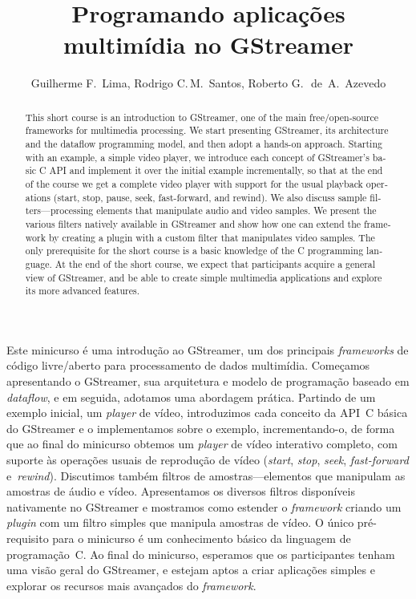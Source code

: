 \documentclass{SBCbookchapter}
\title{Programando aplicações multimídia no GStreamer}
\author{%
  Guilherme F.~Lima,
  Rodrigo C.\,M.~Santos,
  Roberto G.\,~de~A.~Azevedo
}
\begin{document}
\maketitle
{}\baselineskip\strut
\begin{abstract}
  \begin{otherlanguage}{english}
    This short course is an introduction to GStreamer, one of the main
    free/open-source frameworks for multimedia processing.  We start
    presenting GStreamer, its architecture and the dataflow programming
    model, and then adopt a hands-on approach.  Starting with an example, a
    simple video player, we introduce each concept of GStreamer’s basic C
    API and implement it over the initial example incrementally, so that at
    the end of the course we get a complete video player with support for
    the usual playback operations (start, stop, pause, seek, fast-forward,
    and rewind).  We also discuss sample filters---processing elements that
    manipulate audio and video samples.  We present the various filters
    natively available in GStreamer and show how one can extend the
    framework by creating a plugin with a custom filter that manipulates
    video samples.  The only prerequisite for the short course is a basic
    knowledge of the C programming language.  At the end of the short
    course, we expect that participants acquire a general view of GStreamer,
    and be able to create simple multimedia applications and explore its
    more advanced features.
  \end{otherlanguage}
\end{abstract}
\begin{resumo}
  Este minicurso é uma introdução ao GStreamer, um dos principais
  \emph{frameworks} de código livre/aberto para processamento de dados
  multimídia.  Começamos apresentando o GStreamer, sua arquitetura e modelo
  de programação baseado em \emph{dataflow}, e em seguida, adotamos uma
  abordagem prática.  Partindo de um exemplo inicial, um \emph{player} de
  vídeo, introduzimos cada conceito da API~C básica do GStreamer e o
  implementamos sobre o exemplo, incrementando-o, de forma que ao final do
  minicurso obtemos um \emph{player} de vídeo interativo completo, com
  suporte às operações usuais de reprodução de vídeo (\emph{start},
  \emph{stop}, \emph{seek}, \emph{fast-forward} e~\emph{rewind}).
  Discutimos também filtros de amostras---elementos que manipulam as
  amostras de áudio e vídeo.  Apresentamos os diversos filtros disponíveis
  nativamente no GStreamer e mostramos como estender o \emph{framework}
  criando um \emph{plugin} com um filtro simples que manipula amostras de
  vídeo.  O único pré-requisito para o minicurso é um conhecimento básico da
  linguagem de programação~C.  Ao final do minicurso, esperamos que os
  participantes tenham uma visão geral do GStreamer, e estejam aptos a criar
  aplicações simples e explorar os recursos mais avançados do
  \emph{framework}.
\end{resumo}
\end{document}
